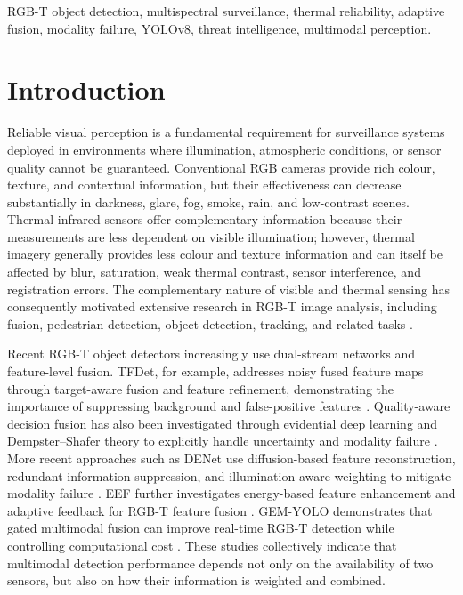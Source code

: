 \documentclass[conference]{IEEEtran}
\begin{document}
\begin{IEEEkeywords}
RGB-T object detection, multispectral surveillance, thermal reliability, adaptive fusion, modality failure, YOLOv8, threat intelligence, multimodal perception.
\end{IEEEkeywords}


\section{Introduction}

Reliable visual perception is a fundamental requirement for surveillance systems deployed in environments where illumination, atmospheric conditions, or sensor quality cannot be guaranteed. Conventional RGB cameras provide rich colour, texture, and contextual information, but their effectiveness can decrease substantially in darkness, glare, fog, smoke, rain, and low-contrast scenes. Thermal infrared sensors offer complementary information because their measurements are less dependent on visible illumination; however, thermal imagery generally provides less colour and texture information and can itself be affected by blur, saturation, weak thermal contrast, sensor interference, and registration errors. The complementary nature of visible and thermal sensing has consequently motivated extensive research in RGB-T image analysis, including fusion, pedestrian detection, object detection, tracking, and related tasks \cite{songSurvey}.

Recent RGB-T object detectors increasingly use dual-stream networks and feature-level fusion. TFDet, for example, addresses noisy fused feature maps through target-aware fusion and feature refinement, demonstrating the importance of suppressing background and false-positive features \cite{tfdet}. Quality-aware decision fusion has also been investigated through evidential deep learning and Dempster--Shafer theory to explicitly handle uncertainty and modality failure \cite{qdfm}. More recent approaches such as DENet use diffusion-based feature reconstruction, redundant-information suppression, and illumination-aware weighting to mitigate modality failure \cite{denet}. EEF further investigates energy-based feature enhancement and adaptive feedback for RGB-T feature fusion \cite{eef}. GEM-YOLO demonstrates that gated multimodal fusion can improve real-time RGB-T detection while controlling computational cost \cite{gemyolo}. These studies collectively indicate that multimodal detection performance depends not only on the availability of two sensors, but also on how their information is weighted and combined.
\end{document}
